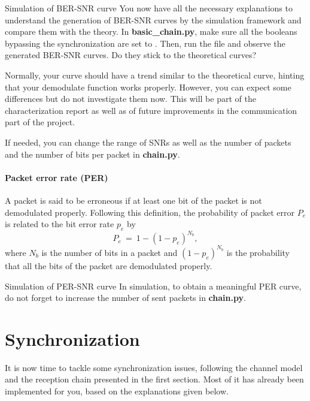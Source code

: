 \begin{bclogo}[couleur = gray!20, arrondi = 0.2, logo=\bccrayon]{Simulation of BER-SNR curve}
You now have all the necessary explanations to understand the generation of BER-SNR curves by the simulation framework and compare them with the theory. In \textbf{basic\_chain.py}, make sure all the booleans bypassing the synchronization are set to . Then, run the file and observe the generated BER-SNR curves. Do they stick to the theoretical curves?

Normally, your curve should have a trend similar to the theoretical curve, hinting that your demodulate function works properly. However, you can expect some differences but do not investigate them now. This will be part of the characterization report as well as of future improvements in the communication part of the project.

If needed, you can change the range of SNRs as well as the number of packets and the number of bits per packet in \textbf{chain.py}.
\end{bclogo}
\paragraph{Packet error rate (PER)} A packet is said to be erroneous if at least one bit of the packet is not demodulated properly. Following this definition, the probability of packet error $P_e$ is related to the bit error rate $p_e$ by
\begin{equation*}
    P_e\:=\:1- (1-p_e)^{N_b},
\end{equation*}
where $N_b$ is the number of bits in a packet and $(1-p_e)^{N_b}$ is the probability that all the bits of the packet are demodulated properly.
\begin{bclogo}[couleur = gray!20, arrondi = 0.2, logo=\bccrayon]{Simulation of PER-SNR curve}
In simulation, to obtain a meaningful PER curve, do not forget to increase the number of sent packets in \textbf{chain.py}.
\end{bclogo}



\section{Synchronization}
It is now time to tackle some synchronization issues, following the channel model and the reception chain presented in the first section. Most of it has already been implemented for you, based on the explanations given below.

